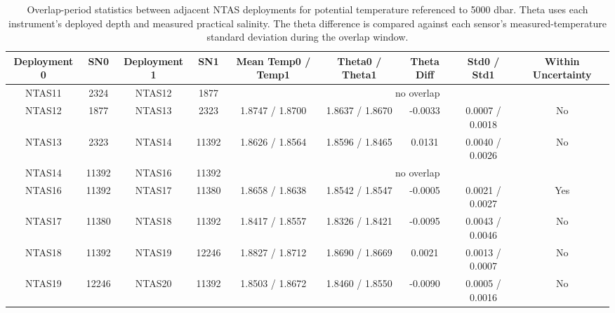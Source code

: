 \begin{table}[h]
\centering
\begin{tabular}{|c|c|c|c|c|c|c|c|c|}
\hline
Deployment 0 & SN0 & Deployment 1 & SN1 & Mean Temp0 / Temp1 & Theta0 / Theta1 & Theta Diff & Std0 / Std1 & Within Uncertainty \\
\hline
NTAS11 & 2324 & NTAS12 & 1877 & \multicolumn{5}{c|}{no overlap} \\
NTAS12 & 1877 & NTAS13 & 2323 & 1.8747 / 1.8700 & 1.8637 / 1.8670 & -0.0033 & 0.0007 / 0.0018 & No \\
NTAS13 & 2323 & NTAS14 & 11392 & 1.8626 / 1.8564 & 1.8596 / 1.8465 & 0.0131 & 0.0040 / 0.0026 & No \\
NTAS14 & 11392 & NTAS16 & 11392 & \multicolumn{5}{c|}{no overlap} \\
NTAS16 & 11392 & NTAS17 & 11380 & 1.8658 / 1.8638 & 1.8542 / 1.8547 & -0.0005 & 0.0021 / 0.0027 & Yes \\
NTAS17 & 11380 & NTAS18 & 11392 & 1.8417 / 1.8557 & 1.8326 / 1.8421 & -0.0095 & 0.0043 / 0.0046 & No \\
NTAS18 & 11392 & NTAS19 & 12246 & 1.8827 / 1.8712 & 1.8690 / 1.8669 & 0.0021 & 0.0013 / 0.0007 & No \\
NTAS19 & 12246 & NTAS20 & 11392 & 1.8503 / 1.8672 & 1.8460 / 1.8550 & -0.0090 & 0.0005 / 0.0016 & No \\
\hline
\end{tabular}
\caption{Overlap-period statistics between adjacent NTAS deployments for potential temperature referenced to 5000 dbar. Theta uses each instrument's deployed depth and measured practical salinity. The theta difference is compared against each sensor's measured-temperature standard deviation during the overlap window.}
\end{table}
